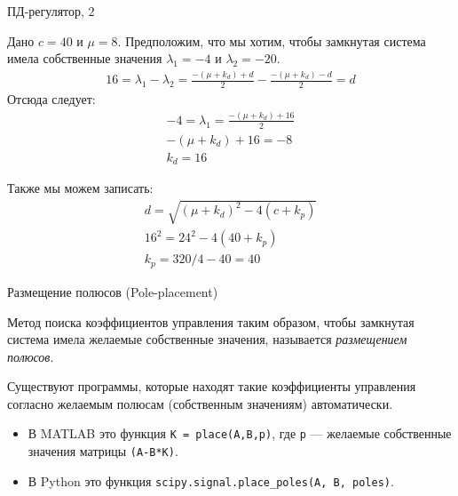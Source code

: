 \documentclass{beamer}
\begin{document}
\begin{frame}{ПД-регулятор, 2}
	\begin{flushleft}
		
		Дано $c = 40$ и $\mu = 8$. Предположим, что мы хотим, чтобы замкнутая система имела собственные значения $\lambda_1 = -4$ и $\lambda_2 = -20$.
		\begin{align}
			16 = \lambda_1 - \lambda_2= \frac{-(\mu + k_d) +d}{2} - \frac{-(\mu + k_d) - d}{2}  = d
		\end{align}
		Отсюда следует:
		\begin{align}
			-4 = \lambda_1 = \frac{-(\mu + k_d) + 16}{2}
			\\
			-(\mu + k_d) + 16 = -8
			\\
			k_d  = 16
		\end{align}
		
		
		Также мы можем записать:
		\begin{align}
			d = \sqrt{(\mu + k_d)^2 - 4 (c+k_p)}
			\\
			16^2 = 24^2 - 4 (40 + k_p)
			\\
			k_p = 320 / 4 - 40 = 40
		\end{align}
		
		
	\end{flushleft}
\end{frame}




\begin{frame}{Размещение полюсов (Pole-placement)}
	\begin{flushleft}
		
		Метод поиска коэффициентов управления таким образом, чтобы замкнутая система имела желаемые собственные значения, называется \emph{размещением полюсов}.
		
		\bigskip
		
		Существуют программы, которые находят такие коэффициенты управления согласно желаемым полюсам (собственным значениям) автоматически.
		
		\bigskip
		
		\begin{itemize}
			\item В MATLAB это функция \texttt{K = place(A,B,p)}, где \texttt{p} — желаемые собственные значения матрицы \texttt{(A-B*K)}.
			
			\item В Python это функция \texttt{scipy.signal.place\_poles(A, B, poles)}.
		\end{itemize}
		
		
		
	\end{flushleft}
\end{frame}
\end{document}
